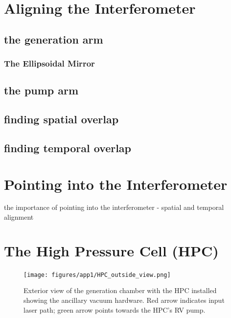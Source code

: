 \section{Aligning the Interferometer}
\label{app:aligning-interferometer}

\subsection{the generation arm}

\subsubsection{The Ellipsoidal Mirror}

\subsection{the pump arm}

\subsection{finding spatial overlap}

\subsection{finding temporal overlap}

\section{Pointing into the Interferometer}
\label{app:pointing-into-TABLE}

the importance of pointing into the interferometer - spatial and temporal alignment

\section{The High Pressure Cell (HPC)}
\label{app:HPC_instructions}

\begin{figure}
	\centering
	\texttt{[image: figures/app1/HPC\_outside\_view.png]}
	\caption{Exterior view of the generation chamber with the HPC installed showing the ancillary vacuum hardware. Red arrow indicates input laser path; green arrow points towards the HPC's RV pump.}
	\label{fig:HPC_outside_view}
\end{figure}

